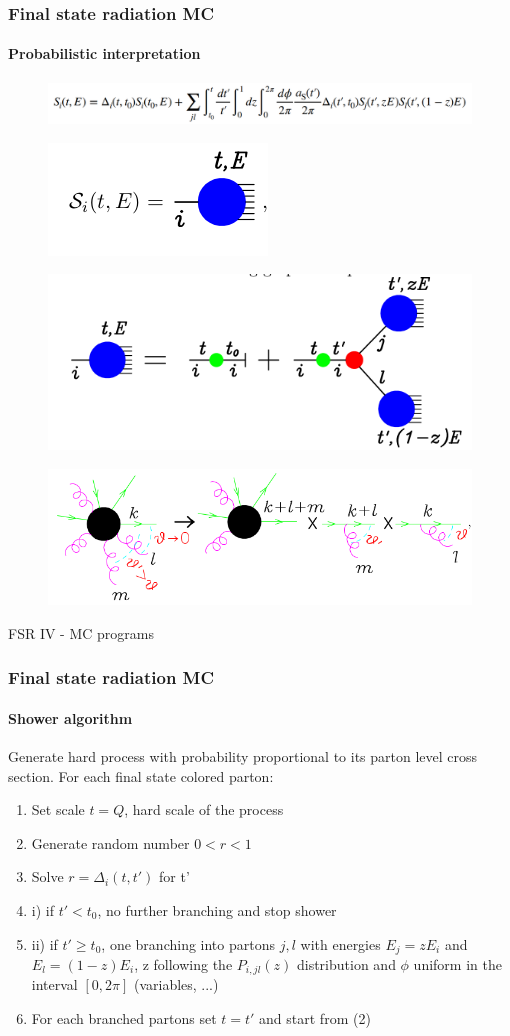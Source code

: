 \documentclass[aspectratio=43]{beamer}
\begin{document}
\begin{frame}

	\frametitle{Final state radiation MC}
	\framesubtitle{Probabilistic interpretation}
	
	\begin{figure}
		\includegraphics[width = 3 cm]{plots/shower_0.png}
	\end{figure}
	
	\begin{figure}
		\includegraphics[width = 3 cm]{plots/shower_1.png}
	\end{figure}

	\begin{figure}
		\includegraphics[width = 3 cm]{plots/shower_2.png}
	\end{figure}

	\begin{figure}
		\includegraphics[width = 3 cm]{plots/shower_4.png}
	\end{figure}


\end{frame}

FSR IV - MC programs
\begin{frame}

	\frametitle{Final state radiation MC}
	\framesubtitle{Shower algorithm}
	
	Generate hard process with probability proportional to its parton level cross section. For each final state colored parton:
	\begin{enumerate} 
		\item Set scale $t = Q$, hard scale of the process
		\item Generate random number $0 < r < 1$
		\item Solve $r = \Delta_{i}(t, t')$ for t'
		\item i) if $t' < t_{0}$, no further branching and stop shower
		\item ii) if $t' \geq t_{0}$, one branching into partons $j, l$ with energies $E_{j} = zE_{i}$ and $E_{l} = (1 - z)E_{i}$, z following the $P_{i, jl}(z)$ distribution and $\phi$ uniform in the interval $[0, 2\pi]$ (variables, ...)
		\item For each branched partons set $t = t'$ and start from (2)
	\end{enumerate}

\end{frame}
\end{document}
